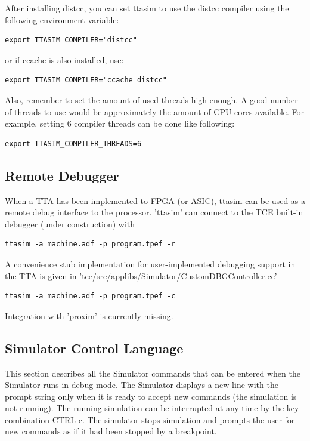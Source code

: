 \documentclass[a4paper,twoside]{tceusermanual}
\begin{document}
After installing distcc, you can set ttasim to use the distcc compiler using the
following environment variable:
\begin{verbatim}
export TTASIM_COMPILER="distcc"
\end{verbatim} or if ccache is also installed, use:
\begin{verbatim}
export TTASIM_COMPILER="ccache distcc"\end{verbatim}

Also, remember to set the amount of used threads high enough. A good number
of threads to use would be approximately the amount of CPU cores
available. For example, setting 6 compiler threads can be done like following:
\begin{verbatim}
export TTASIM_COMPILER_THREADS=6
\end{verbatim}

\subsection{Remote Debugger}

When a TTA has been implemented to FPGA (or ASIC), ttasim can be used
as a remote debug interface to the processor. 'ttasim' can connect to the
TCE built-in debugger (under construction) with 
\begin{verbatim}
ttasim -a machine.adf -p program.tpef -r
\end{verbatim}

A convenience stub implementation for user-implemented debugging support in the TTA
is given in 'tce/src/applibs/Simulator/CustomDBGController.cc'
\begin{verbatim}
ttasim -a machine.adf -p program.tpef -c
\end{verbatim}

Integration with 'proxim' is currently missing.


\subsection{Simulator Control Language}

This section describes all the Simulator commands that can be entered when
the Simulator runs in debug mode.  The Simulator displays a new line with
the prompt string only when it is ready to accept new commands (the simulation
is not running).  The running simulation can be interrupted at any time by
the key combination CTRL-c.  The simulator stops simulation and prompts the
user for new commands as if it had been stopped by a breakpoint.
\end{document}
